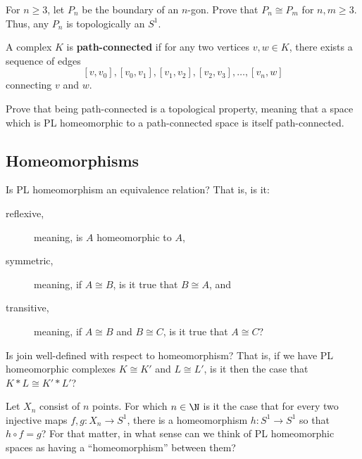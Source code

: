 \documentclass[12pt]{pset}
\newcommand{\defnword}[1]{\textbf{#1}}
\newcommand{\join}{\ast}
\begin{document}
\begin{problem}
  For $n \geq 3$, let $P_n$ be the boundary of an $n$-gon.  Prove that
  $P_n \cong P_m$ for $n,m \geq 3$.  Thus, any $P_n$ is topologically
  an $S^1$.
\end{problem}

\begin{definition*}
  A complex $K$ is \defnword{path-connected} if for any two vertices
  $v, w \in K$, there exists a sequence of edges
  $$
  [v,v_0], [v_0,v_1], [v_1,v_2], [v_2,v_3], \ldots, [v_n,w]
  $$
  connecting $v$ and $w$.
\end{definition*}

\begin{problem}
  Prove that being path-connected is a topological property, meaning
  that a space which is PL homeomorphic to a path-connected space is
  itself path-connected.
\end{problem}


\subsection*{Homeomorphisms}

\begin{problem}
Is PL homeomorphism an equivalence relation?  That is, is it:
\begin{description}
\item[\hspace{1em}reflexive,] meaning, is $A$ homeomorphic to $A$,
\item[\hspace{1em}symmetric,] meaning, if $A \cong B$, is it true that
  $B \cong A$, and
\item[\hspace{1em}transitive,] meaning, if $A \cong B$ and $B \cong C$, is it true that $A \cong C$?
\end{description}
\end{problem}

\begin{requiredproblem}
 Is join well-defined with respect to homeomorphism? That is, if we
 have PL homeomorphic complexes $K \cong K'$ and $L \cong L'$, is it
 then the case that $K \join L \cong K' \join L'$?
\end{requiredproblem}

\begin{problem}
  Let $X_n$ consist of $n$ points.  For which $n \in \N$ is it the
  case that for every two injective maps $f, g : X_n \to S^1$, there
  is a homeomorphism $h : S^1 \to S^1$ so that $h \circ f = g$?  For
  that matter, in what sense can we think of PL homeomorphic spaces as
  having a ``homeomorphism'' between them?
\end{problem}
\end{document}
